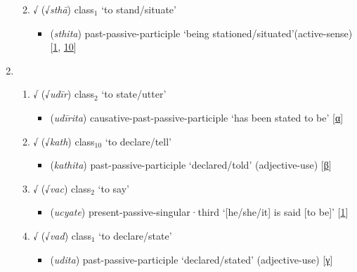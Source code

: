 \begin{enumerate}
\begin{enumerate}
\begin{itemize}
        \end{itemize}
        \item √ (√\textit{sthā}) \acrshort{class}$_\text{1}$  `to stand/situate'
        \begin{itemize}
            \item {} (\textit{sthita})
            \acrshort{past}-\acrshort{passive}-\acrshort{participle} `being stationed/situated'(\acrshort{active}-sense) [\hyperlink{Spass1}{1}, \hyperlink{Spass10}{10}]
        \end{itemize}
        \end{enumerate}
\item   \begin{enumerate}
        \item √ (√\textit{udīr}) \acrshort{class}$_\text{2}$  `to state/utter'
        \begin{itemize}
            \item {} (\textit{udīrita})
            \acrshort{causative}-\acrshort{past}-\acrshort{passive}-\acrshort{participle} `has been stated to be' [\hyperlink{SpassA}{α}]
        \end{itemize}
        \item √ (√\textit{kath}) \acrshort{class}$_\text{10}$  `to declare/tell' 
        \begin{itemize}
            \item {} (\textit{kathita}) \acrshort{past}-\acrshort{passive}-\acrshort{participle}  `declared/told'  (\acrshort{adjective}-use) [\hyperlink{SpassB}{β}]
        \end{itemize}
        \item √ (√\textit{vac}) \acrshort{class}$_\text{2}$  `to say'
        \begin{itemize}
            \item {} (\textit{ucyate}) \acrshort{present}-\acrshort{passive}-\acrshort{singular}·\acrshort{third} `[he/she/it] is said [to be]' [\hyperlink{Spass1}{1}]
        \end{itemize}
        \item √ (√\textit{vad}) \acrshort{class}$_\text{1}$  `to declare/state'
        \begin{itemize}
            \item {} (\textit{udita}) \acrshort{past}-\acrshort{passive}-\acrshort{participle}  `declared/stated' (\acrshort{adjective}-use)  [\hyperlink{SpassD}{γ}]

\end{itemize}
\end{enumerate}
\end{enumerate}
